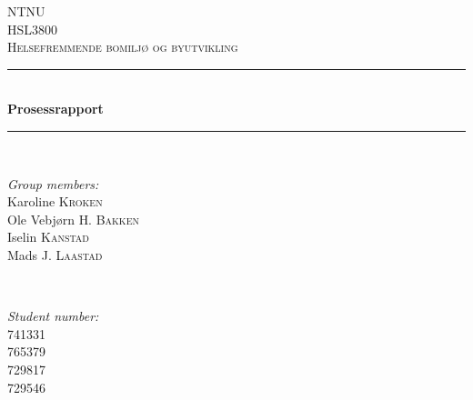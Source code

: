 \documentclass[12pt]{article}
\begin{document}
\begin{titlepage}

\newcommand{\HRule}{\rule{\linewidth}{0.5mm}} %

\center %
 

\textsc{\LARGE NTNU}\\[1.5cm] %
\textsc{\Large HSL3800}\\[0.5cm] %
\textsc{\large Helsefremmende bomiljø og byutvikling}\\[0.5cm] %


\HRule \\[0.4cm]
{ \huge \bfseries Prosessrapport}\\[0.4cm] %
\HRule \\[1.5cm]
 


\begin{minipage}{0.4\textwidth}
\begin{flushleft} \large
\emph{Group members:}\\
Karoline \textsc{Kroken} \\ %
Ole Vebjørn \textsc{H. Bakken}\\ %
Iselin \textsc{Kanstad}\\ %
Mads J. \textsc{Laastad} \\%
\end{flushleft}
\end{minipage}
~
\begin{minipage}{0.4\textwidth}
\begin{flushright} \large
\emph{Student number:}\\
741331\\
765379\\
729817\\
729546\\
\end{flushright}
\end{minipage}\\[4cm]


\end{titlepage}
\end{document}
